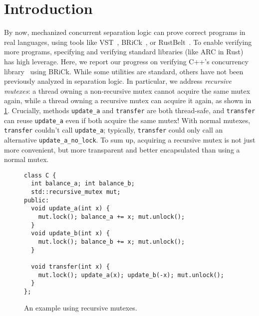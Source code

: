 \documentclass[sigplan,screen]{acmart}
\begin{document}


\maketitle

\section{Introduction}
By now, mechanized concurrent separation logic can prove correct programs in real languages, using tools like VST~\cite{vst}, BRiCk~\cite{brick}, or RustBelt~\cite{rustbelt}.
To enable verifying more programs, specifying and verifying standard libraries (like ARC in Rust) has high leverage.
Here, we report our progress on verifying C++'s concurrency library~\cite{} using BRiCk. While some utilities are standard, others have not been previously
analyzed in separation logic.
In particular, we address \emph{recursive mutexes}:
a thread owning a non-recursive mutex cannot acquire the same mutex again,
while a thread owning a recursive mutex can acquire it again, as shown in \cref{fig:rec-mutex}.
Crucially, methods \verb!update_a! and \verb!transfer! are both thread-safe, and
\verb!transfer! can reuse \verb!update_a! even if both acquire the same mutex!
With normal mutexes, \verb!transfer! couldn't call \verb!update_a!; typically,
\verb!transfer! could only call an alternative \verb!update_a_no_lock!.
To sum up, acquiring a recursive mutex is not just more convenient, but more
transparent and better encapsulated than using a normal mutex.


\begin{figure}[h]
  \small
\begin{verbatim}
class C {
  int balance_a; int balance_b;
  std::recursive_mutex mut;
public:
  void update_a(int x) {
    mut.lock(); balance_a += x; mut.unlock();
  }
  void update_b(int x) {
    mut.lock(); balance_b += x; mut.unlock();
  }

  void transfer(int x) {
    mut.lock(); update_a(x); update_b(-x); mut.unlock();
  }
};
\end{verbatim}
  \caption{An example using recursive mutexes.}
  \label{fig:rec-mutex}
\end{figure}
\end{document}

